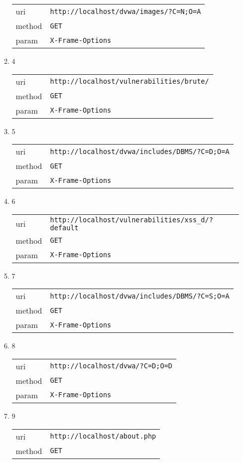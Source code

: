 \documentclass[10pt]{article}
\begin{document}
\begin{itemize}
\begin{enumerate}
\begin{tabular}{| l | p{12cm}}
uri & \texttt{http://localhost/dvwa/images/?C=N;O=A} \\
method & \texttt{GET} \\
param & \texttt{X-Frame-Options} \\
\end{tabular}
\item[] 4
\begin{tabular}{| l | p{12cm}}
uri & \texttt{http://localhost/vulnerabilities/brute/} \\
method & \texttt{GET} \\
param & \texttt{X-Frame-Options} \\
\end{tabular}
\item[] 5
\begin{tabular}{| l | p{12cm}}
uri & \texttt{http://localhost/dvwa/includes/DBMS/?C=D;O=A} \\
method & \texttt{GET} \\
param & \texttt{X-Frame-Options} \\
\end{tabular}
\item[] 6
\begin{tabular}{| l | p{12cm}}
uri & \texttt{http://localhost/vulnerabilities/xss\_d/?default} \\
method & \texttt{GET} \\
param & \texttt{X-Frame-Options} \\
\end{tabular}
\item[] 7
\begin{tabular}{| l | p{12cm}}
uri & \texttt{http://localhost/dvwa/includes/DBMS/?C=S;O=A} \\
method & \texttt{GET} \\
param & \texttt{X-Frame-Options} \\
\end{tabular}
\item[] 8
\begin{tabular}{| l | p{12cm}}
uri & \texttt{http://localhost/dvwa/?C=D;O=D} \\
method & \texttt{GET} \\
param & \texttt{X-Frame-Options} \\
\end{tabular}
\item[] 9
\begin{tabular}{| l | p{12cm}}
uri & \texttt{http://localhost/about.php} \\
method & \texttt{GET} \\

\end{tabular}
\end{enumerate}
\end{itemize}
\end{document}
